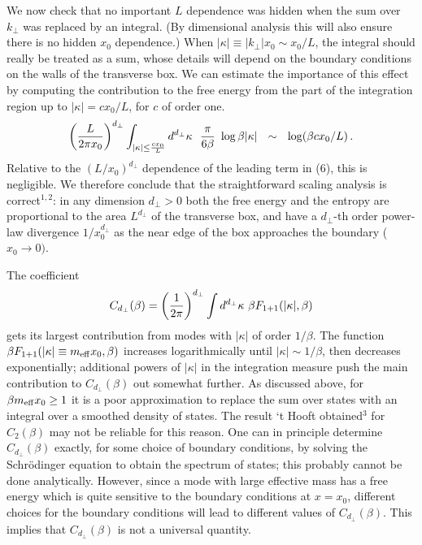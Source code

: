 We now check that no important $L$ dependence was hidden
when the sum over $k_\perp$ was replaced by an integral.
(By dimensional analysis this will also ensure
there is no hidden $x_0$ dependence.)
When $\vert\kappa\vert \equiv \vert k_\perp\vert x_0 \sim x_0/L$,
the integral
should really be treated as a sum, whose details will depend on
the boundary conditions on the walls of the transverse box.    We can
estimate the importance of this effect by computing the
contribution to the free energy from the part of the integration
region up to $\vert\kappa\vert = c x_0/L$, for $c$ of order one.
$$
 \left({L \over 2 \pi x_0}\right)^{d_\perp}
              \int_{\vert\kappa\vert \leq {c x_0\over L}} d^{d_\perp}\kappa \ \
{\pi \over 6 \beta}\ \log { \beta \vert\kappa\vert}
\ \ \sim \ \ \log(\beta c x_0/L )\,.
$$
Relative to the $(L/x_0)^{d_\perp}$ dependence of the leading term in (6),
this is negligible.
We therefore conclude that the straightforward scaling analysis is
correct$^{1,2}$: in any dimension $d_\perp>0$
both the free energy and the entropy are proportional to the
area $L^{d_\perp}$ of the transverse box, and
have a $d_\perp$-th order power-law divergence $1/x_0^{d_\perp}$
as the near edge of the box approaches the boundary ($x_0\rightarrow 0)$.

The coefficient
$$C_{d_\perp}(\beta) =  \left({1 \over 2 \pi }\right)^{d_\perp}
        \int d^{d_\perp}\kappa\ \beta F_{1+1}(\vert\kappa\vert,\beta)$$
gets its largest contribution from modes with $\vert\kappa\vert$
of order $1/\beta$.  The function
$\beta F_{1+1}(\vert\kappa\vert \equiv m_{\rm eff}x_0,\beta)$ increases
logarithmically  until $\vert\kappa\vert  \sim 1/\beta $,
then decreases exponentially;  additional powers of
$\vert\kappa\vert$ in the integration measure
push the main contribution to $C_{d_\perp}(\beta)$ out somewhat further.
As discussed above, for $\beta m_{\rm eff}x_0\geq 1$
it is a poor approximation to replace
the sum over states with an integral over a smoothed density
of states.   The result `t Hooft obtained$^3$ for $C_2(\beta)$
may not be reliable for this reason.   One can in principle determine
$C_{d_\perp}(\beta)$ exactly, for some choice
of boundary conditions, by solving the Schr\"odinger
equation to obtain the spectrum of states;
this probably cannot be done analytically.  However,
since a mode with large effective mass has a free energy which is
quite sensitive to the
boundary conditions at $x=x_0$, different choices for the
boundary conditions will lead to
different values of $C_{d_\perp}(\beta)$.
This implies that
$C_{d_\perp}(\beta)$ is not a universal quantity.

